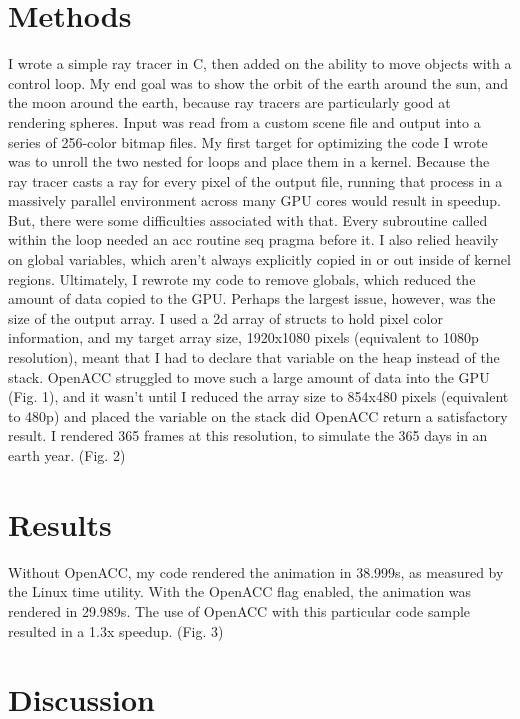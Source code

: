 \documentclass{article}
\begin{document}
\section{Methods}
I wrote a simple ray tracer in C, then added on the ability to move objects with a control loop. My end goal was to show the orbit of the earth around the sun, and the moon around the earth, because ray tracers are particularly good at rendering spheres. Input was read from a custom scene file and output into a series of 256-color bitmap files. 
	My first target for optimizing the code I wrote was to unroll the two nested for loops and place them in a kernel. Because the ray tracer casts a ray for every pixel of the output file, running that process in a massively parallel environment across many GPU cores would result in speedup. But, there were some difficulties associated with that. Every subroutine called within the loop needed an acc routine seq pragma before it. I also relied heavily on global variables, which aren’t always explicitly copied in or out inside of kernel regions. Ultimately, I rewrote my code to remove globals, which reduced the amount of data copied to the GPU. Perhaps the largest issue, however, was the size of the output array. I used a 2d array of structs to hold pixel color information, and my target array size, 1920x1080 pixels (equivalent to 1080p resolution), meant that I had to declare that variable on the heap instead of the stack. OpenACC struggled to move such a large amount of data into the GPU (Fig. 1), and it wasn’t until I reduced the array size to 854x480 pixels (equivalent to 480p) and placed the variable on the stack did OpenACC return a satisfactory result. I rendered 365 frames at this resolution, to simulate the 365 days in an earth year. (Fig. 2)

\section{Results}
Without OpenACC, my code rendered the animation in 38.999s, as measured by the Linux time utility. With the OpenACC flag enabled, the animation was rendered in 29.989s. The use of OpenACC with this particular code sample resulted in a 1.3x speedup. (Fig. 3)

\section{Discussion}
\end{document}
